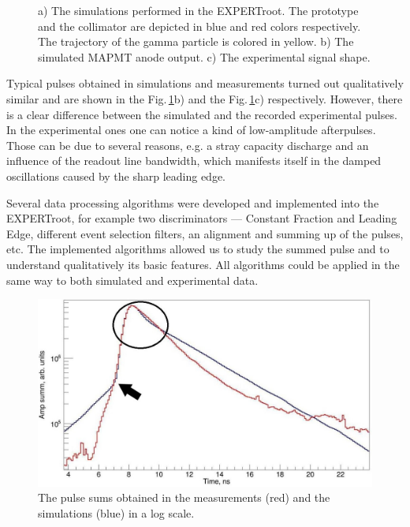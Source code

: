 \documentclass{webofc}
\newcommand{\er}{\textmd{EXPERTroot}}
\begin{document}
\begin{figure}[h]
\begin{minipage}[h]{0.35\linewidth}
	\end{minipage}
	\caption{a) The simulations performed in the \er. The prototype and the collimator are depicted in blue and red colors respectively. The trajectory of the gamma particle is colored in yellow. b) The simulated MAPMT anode output. c) The experimental signal shape.}
	\label{ris:sim}
\end{figure}
Typical pulses obtained in simulations and measurements turned out qualitatively similar and are shown in the Fig.\,\ref{ris:sim}b) and the Fig.\,\ref{ris:sim}c) respectively. However, there is a clear difference between the simulated and the recorded experimental pulses. In the experimental ones one can notice a kind of low-amplitude afterpulses. Those can be due to several reasons, e.g. a stray capacity discharge and an influence of the readout line bandwidth, which manifests itself in the damped oscillations caused by the sharp leading edge.

Several data processing algorithms were developed and implemented into the \er, for example two discriminators --- Constant Fraction and Leading Edge, different event selection filters, an alignment and summing up of the pulses, etc. The implemented algorithms allowed us to study the summed pulse and to understand qualitatively its basic features. All algorithms could be applied in the same way to both simulated and experimental data.


\begin{figure}[h]
	\centering
	\includegraphics[width=0.6\linewidth]{summ1.png}
	\caption{The pulse sums obtained in the measurements (red) and the simulations (blue) in a log scale.}\label{ris:sum}
\end{figure}
\end{document}
